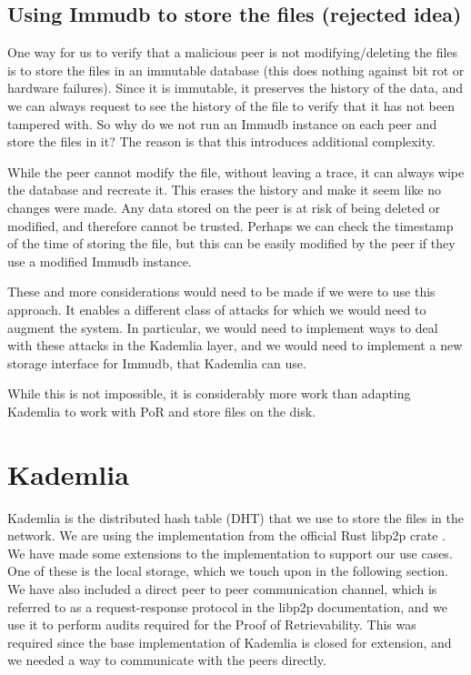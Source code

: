 \subsection{Using Immudb to store the files (rejected idea)}

One way for us to verify that a malicious peer is not modifying/deleting the files is
to store the files in an immutable database (this does nothing against bit rot or hardware failures).
Since it is immutable, it preserves the history of the data, and we can always request to see the history
of the file to verify that it has not been tampered with.
So why do we not run an Immudb instance on each peer and store the files in it?
The reason is that this introduces additional complexity.

While the peer cannot modify the file, without leaving a trace,
it can always wipe the database and recreate it.
This erases the history and make it seem like no changes were made.
Any data stored on the peer is at risk of being deleted or modified,
and therefore cannot be trusted.
Perhaps we can check the timestamp of the time of storing the file,
but this can be easily modified by the peer if they use a modified Immudb instance.

These and more considerations would need to be made if we were to use this approach.
It enables a different class of attacks for which we would need to augment the system.
In particular, we would need to implement ways to deal with these attacks in the Kademlia layer,
and we would need to implement a new storage interface for Immudb, that Kademlia can use.

While this is not impossible, it is considerably more work than adapting Kademlia to
work with PoR and store files on the disk.

\section{Kademlia}

Kademlia is the distributed hash table (DHT) that we use to store the files in the network.
We are using the implementation from the official Rust libp2p crate \cite{rustlibp2p}.
We have made some extensions to the implementation to support our use cases.
One of these is the local storage, which we touch upon in the following section.
We have also included a direct peer to peer communication channel,
which is referred to as a request-response protocol in the libp2p documentation,
and we use it to perform audits required for the Proof of Retrievability.
This was required since the base implementation of Kademlia is closed for extension,
and we needed a way to communicate with the peers directly.

